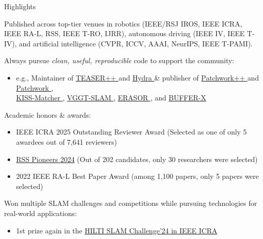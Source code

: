 \cventry
  {} %
  {Highlights\vspace{-0.3cm}} %
  {} %
  {} %
  {
    \begin{cvitems} %
      \item Published across top-tier venues in robotics (IEEE/RSJ IROS, IEEE ICRA, IEEE RA-L, RSS, IEEE T-RO, IJRR), autonomous driving (IEEE IV, IEEE T-IV), and artificial intelligence (CVPR, ICCV, AAAI, NeurIPS, IEEE T-PAMI).
      \item Always pursue \textit{clean, useful, reproducible} code to support the community:
        \begin{itemize}
          \item e.g., Maintainer of \href{https://github.com/MIT-SPARK/TEASER-plusplus}{TEASER++ } and \href{https://github.com/MIT-SPARK/Hydra}{Hydra } \& publisher of \href{https://github.com/url-kaist/patchwork-plusplus}{Patchwork++ } and \href{https://github.com/LimHyungTae/patchwork}{Patchwork }, \\ \href{https://github.com/MIT-SPARK/KISS-Matcher}{KISS-Matcher }, \href{https://github.com/MIT-SPARK/VGGT-SLAM}{VGGT-SLAM }, \href{https://github.com/LimHyungTae/ERASOR}{ERASOR }, and \href{https://github.com/MIT-SPARK/BUFFER-X}{BUFFER-X }
        \end{itemize}
      \item Academic honors \& awards:
        \begin{itemize}
          \item IEEE ICRA 2025 Outstanding Reviewer Award (Selected as one of only 5 awardees out of 7,641 reviewers)
          \item \href{https://sites.google.com/view/rsspioneers2024/participants}{RSS Pioneers 2024} (Out of 202 candidates, only 30 researchers were selected)
          \item {2022 IEEE RA-L Best Paper Award (among 1,100 papers, only 5 papers were selected)\lineintv}
        \end{itemize}
            \item Won multiple SLAM challenges and competitions while pursuing technologies for real-world applications:
        \begin{itemize}
          \item 1st prize again in the \href{https://construction-robots.github.io/\#challenge}{HILTI SLAM Challenge'24 in IEEE ICRA}

\end{itemize}
\end{cvitems}}
